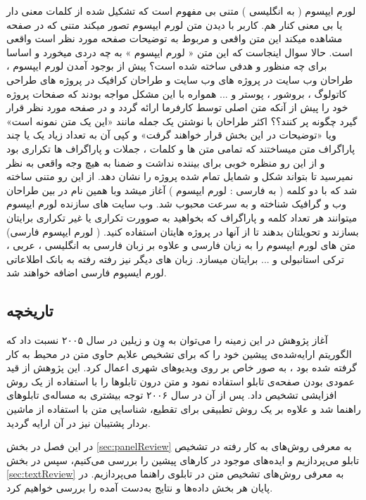 \documentclass[oneside,openany,mscS]{SBU-Thesis}
\begin{document}
	لورم ایپسوم ( به انگلیسی  ) متنی بی مفهوم است که تشکیل شده از کلمات معنی دار یا بی معنی کنار هم. کاربر با دیدن متن لورم ایپسوم تصور میکند متنی که در صفحه مشاهده میکند این متن واقعی و مربوط به توضیحات صفحه مورد نظر است واقعی است. حالا سوال اینجاست که این متن « لورم ایپسوم » به چه دردی میخورد و اساسا برای چه منظور و هدفی ساخته شده است؟ پیش از بوجود آمدن لورم ایپسوم ، طراحان وب سایت در پروژه های وب سایت و طراحان کرافیک در پروژه های طراحی کاتولوگ ، بروشور ، پوستر و ... همواره با این مشکل مواجه بودند که صفحات پروژه خود را پیش از آنکه متن اصلی توسط کارفرما ارائه گردد و در صفحه مورد نظر قرار گیرد چگونه پر کنند؟؟ اکثر طراحان با نوشتن یک جمله مانند «این یک متن نمونه است» ویا «توضیحات در این بخش قرار خواهند گرفت» و کپی آن به تعداد زیاد یک یا چند پاراگراف متن میساختند که تمامی متن ها و کلمات ، جملات و پاراگراف ها تکراری بود و از این رو منظره خوبی برای بیننده نداشت و ضمنا به هیچ وجه واقعی به نظر نمیرسید تا بتواند شکل و شمایل تمام شده پروژه را نشان دهد. از این رو متنی ساخته شد که با دو کلمه ( به فارسی : لورم ایپسوم ) آغاز میشد وبا همین نام در بین طراحان وب و گرافیک شناخته و به سرعت محبوب شد. وب سایت های سازنده لورم ایپسوم میتوانند هر تعداد کلمه و پاراگراف که بخواهید به صوورت تکراری یا غیر تکراری برایتان بسازند و تحویلتان بدهند تا از آنها در پروژه هایتان استفاده کنید. ( لورم ایپسوم فارسی) متن های لورم ایپسوم را به زبان فارسی و علاوه بر زبان فارسی به انگلیسی ، عربی ، ترکی استانبولی و ... برایتان میسازد. زبان های دیگر نیز رفته رفته به بانک اطلاعاتی لورم ایسپوم فارسی اضافه خواهند شد.  
	
	\subsection{تاریخچه}
	
	آغاز پژوهش در این زمینه را می‌توان به وِن و زیلین \cite{Wu2005} 
	در سال ۲۰۰۵ نسبت داد که الگوریتم ارایه‌شده‌ی پیشین خود را که برای تشخیص علایم حاوی متن در محیط به‌ کار گرفته‌ شده بود \cite{Chen2004}، به صور خاص بر روی ویدیوهای شهری اعمال کرد. این پژوهش از قید عمودی بودن صفحه‌ی تابلو استفاده نمود و متن درون تابلوها را با استفاده از یک روش افزایشی تشخیص داد. پس از آن در سال ۲۰۰۶ توجه بیشتری به مساله‌ی تابلوهای راهنما شد \cite{reina2006adaptive, vazquez2006approach} و علاوه بر یک روش تطبیقی برای تقطیع، شناسایی متن با استفاده از ماشین بردار پشتیبان
	نیز در آن ارایه گردید. 
	
	
	در این فصل در بخش \ref{sec:panelReview} به معرفی روش‌های به کار رفته در تشخیص تابلو می‌پردازیم و ایده‌های موجود در کارهای پیشین را بررسی می‌کنیم، سپس در بخش \ref{sec:textReview} به معرفی روش‌های تشخیص متن در تابلوی راهنما می‌پردازیم. در پایان هر بخش داده‌ها و نتایج به‌دست آمده را بررسی خواهیم کرد. 
	
\end{document}
